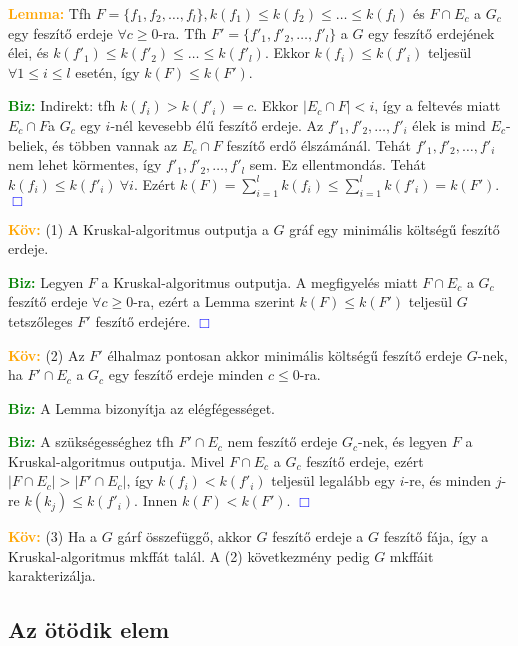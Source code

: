 \documentclass[../szamtud.tex]{subfiles}
\begin{document}
        \textcolor{orange}{\textbf{Lemma:}} Tfh $F=\{f_1,f_2,\dots,f_l\}, k(f_1) \leq k(f_2) \leq \dots \leq k(f_l)$ és $F\cap E_c$ a $G_c$ egy feszítő erdeje $\forall c \geq 0$-ra. Tfh $F' = \{f'_1, f'_2,\dots,f'_l\}$ a $G$ egy feszítő erdejének élei, és $k(f'_1) \leq k(f'_2) \leq \dots \leq k(f'_l)$. Ekkor $k(f_i) \leq k(f'_i)$ teljesül $\forall 1 \leq i \leq l$ esetén, így $k(F) \leq k(F')$.
        
        \textcolor{green}{\textbf{Biz:}} Indirekt: tfh $k(f_i) > k(f'_i) = c$. Ekkor $|E_c \cap F| <i$, így a feltevés miatt $E_c \cap F$a $G_c$ egy $i$-nél kevesebb élű feszítő erdeje. Az $f'_1, f'_2, \dots, f'_i$ élek is mind $E_c$-beliek, és többen vannak az $E_c\cap F$ feszítő erdő élszámánál. Tehát $f'_1, f'_2, \dots, f'_i$ nem lehet körmentes, így $f'_1, f'_2, \dots, f'_l$ sem. Ez ellentmondás. Tehát $k(f_i) \leq k(f'_i) \:\forall i$. Ezért $k(F) = \sum_{i=1}^{l}k(f_i) \leq \sum_{i=1}^{l}k(f'_i)=k(F')$. \textcolor{blue}{$\Box$} 

        \textcolor{orange}{\textbf{Köv:}} (1) A Kruskal-algoritmus outputja a $G$ gráf egy minimális költségű feszítő erdeje. 
        
        \textcolor{green}{\textbf{Biz:}} Legyen $F$ a Kruskal-algoritmus outputja. A megfigyelés miatt $F \cap E_c$ a $G_c$ feszítő erdeje $\forall c \geq 0$-ra, ezért a Lemma szerint $k(F) \leq k(F')$ teljesül $G$ tetszőleges $F'$ feszítő erdejére. \textcolor{blue}{$\Box$} 

        \textcolor{orange}{\textbf{Köv:}} (2) Az $F'$ élhalmaz pontosan akkor minimális költségű feszítő erdeje $G$-nek, ha $F' \cap E_c$ a $G_c$ egy feszítő erdeje minden $c \leq 0$-ra.

        \textcolor{green}{\textbf{Biz:}} A Lemma bizonyítja az elégfégességet.

        \textcolor{green}{\textbf{Biz:}} A szükségességhez tfh $F' \cap E_c$ nem feszítő erdeje $G_c$-nek, és legyen $F$ a Kruskal-algoritmus outputja. Mivel $F \cap E_c$ a $G_c$ feszítő erdeje, ezért $|F \cap E_c| > |F' \cap E_c|$, így $k(f_i) < k(f'_i)$ teljesül legalább egy $i$-re, és minden $j$-re $k(k_j) \leq k(f'_i)$. Innen $k(F) < k(F')$. \textcolor{blue}{$\Box$}

        \textcolor{orange}{\textbf{Köv:}} (3) Ha a $G$ gárf összefüggő, akkor $G$ feszítő erdeje a $G$ feszítő fája, így a Kruskal-algoritmus mkffát talál. A (2) következmény pedig $G$ mkffáit karakterizálja.
    
    \subsection{Az ötödik elem}
    
\end{document}
